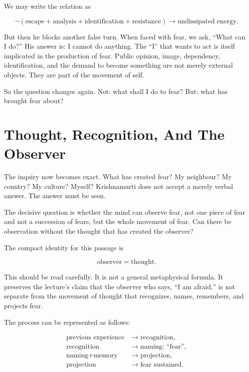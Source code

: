 We may write the relation as

\begin{equation}
\neg(\text{escape}+\text{analysis}+\text{identification}+\text{resistance})
\longrightarrow
\text{undissipated energy}.
\end{equation}

But then he blocks another false turn. When faced with fear, we ask, ``What can I do?'' His answer is: I cannot do anything. The ``I'' that wants to act is itself implicated in the production of fear. Public opinion, image, dependency, identification, and the demand to become something are not merely external objects. They are part of the movement of self.

So the question changes again. Not: what shall I do to fear? But: what has brought fear about?

\section{Thought, Recognition, And The Observer}

The inquiry now becomes exact. What has created fear? My neighbour? My country? My culture? Myself? Krishnamurti does not accept a merely verbal answer. The answer must be seen.

The decisive question is whether the mind can observe fear, not one piece of fear and not a succession of fears, but the whole movement of fear. Can there be observation without the thought that has created the observer?

The compact identity for this passage is

\begin{equation}
\text{observer} = \text{thought}.
\end{equation}

This should be read carefully. It is not a general metaphysical formula. It preserves the lecture's claim that the observer who says, ``I am afraid,'' is not separate from the movement of thought that recognizes, names, remembers, and projects fear.

The process can be represented as follows:

\begin{align}
\text{previous experience} &\longrightarrow \text{recognition}, \\
\text{recognition} &\longrightarrow \text{naming: ``fear''}, \\
\text{naming}+\text{memory} &\longrightarrow \text{projection}, \\
\text{projection} &\longrightarrow \text{fear sustained}.
\end{align}

